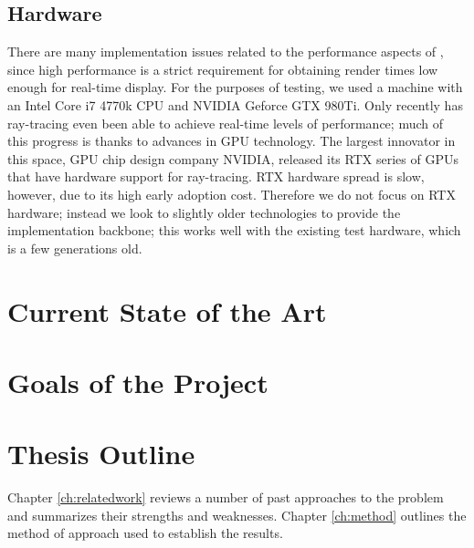 \subsection{Hardware}
\label{ch:intro:background:hardware}

There are many implementation issues related to the performance aspects of \name, since high performance is a strict requirement for obtaining render times low enough for real-time display.
For the purposes of testing, we used a machine with an Intel Core i7 4770k CPU and NVIDIA Geforce GTX 980Ti.
Only recently has ray-tracing even been able to achieve real-time levels of performance; much of this progress is thanks to advances in GPU technology.
The largest innovator in this space, GPU chip design company NVIDIA, released its RTX series of GPUs that have hardware support for ray-tracing.
RTX hardware spread is slow, however, due to its high early adoption cost.
Therefore we do not focus on RTX hardware; instead we look to slightly older technologies to provide the implementation backbone; this works well with the existing test hardware, which is a few generations old.


\section{Current State of the Art}\label{ch:intro:stateofart}

\section{Goals of the Project}\label{ch:intro:goals}


\section{Thesis Outline}\label{ch:intro:outline}
Chapter \ref{ch:relatedwork} reviews a number of past approaches
to the problem and summarizes their strengths and weaknesses. Chapter
\ref{ch:method} outlines the method of approach used to establish the
results.
